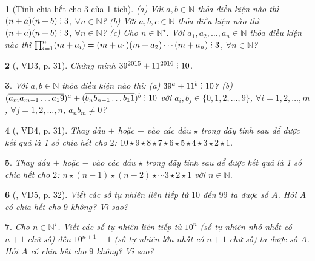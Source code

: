\documentclass{article}
\newtheorem{baitoan}{}
\DeclareRobustCommand{\divby}{%
	\mathrel{\vbox{\baselineskip.65ex\lineskiplimit0pt\hbox{.}\hbox{.}\hbox{.}}}%
}
\begin{document}
\begin{baitoan}[Tính chia hết cho 3 của 1 tích]
	(a) Với $a,b\in\mathbb{N}$ thỏa điều kiện nào thì $(n + a)(n + b)\divby3$, $\forall n\in\mathbb{N}$? (b) Với $a,b,c\in\mathbb{N}$ thỏa điều kiện nào thì $(n + a)(n + b)\divby3$, $\forall n\in\mathbb{N}$? (c) Cho $n\in\mathbb{N}^\star$. Với $a_1,a_2,\ldots,a_n\in\mathbb{N}$ thỏa điều kiện nào thì $\prod_{i=1}^n (m + a_i) = (m + a_1)(m + a_2)\cdots(m + a_n)\divby3$, $\forall n\in\mathbb{N}$?
\end{baitoan}

\begin{baitoan}[\cite{Binh_boi_duong_Toan_6_tap_1}, VD3, p. 31]
	Chứng minh $39^{2015} + 11^{2016}\divby10$.
\end{baitoan}

\begin{baitoan}
	Với $a,b\in\mathbb{N}$ thỏa điều kiện nào thì: (a) $39^a + 11^b\divby10$? (b) $(\overline{a_ma_{m-1}\ldots a_19})^a + (\overline{b_nb_{n-1}\ldots b_11})^b\divby10$ với $a_i,b_j\in\{0,1,2,\ldots,9\}$, $\forall i = 1,2,\ldots,m$, $\forall j = 1,2,\ldots,n$, $a_nb_m\ne0$?
\end{baitoan}

\begin{baitoan}[\cite{Binh_boi_duong_Toan_6_tap_1}, VD4, p. 31]
	Thay dấu $+$ hoặc $-$ vào các dấu $\star$ trong dãy tính sau để được kết quả là 1 số chia hết cho $2$: $10\star9\star8\star7\star6\star5\star4\star3\star2\star1$.
\end{baitoan}

\begin{baitoan}
	Thay dấu $+$ hoặc $-$ vào các dấu $\star$ trong dãy tính sau để được kết quả là 1 số chia hết cho $2$: $n\star(n - 1)\star(n - 2)\star\cdots3\star2\star1$ với $n\in\mathbb{N}$.
\end{baitoan}

\begin{baitoan}[\cite{Binh_boi_duong_Toan_6_tap_1}, VD5, p. 32]
	Viết các số tự nhiên liên tiếp từ $10$ đến $99$ ta được số $A$. Hỏi $A$ có chia hết cho $9$ không? Vì sao?
\end{baitoan}

\begin{baitoan}
	Cho $n\in\mathbb{N}^\star$. Viết các số tự nhiên liên tiếp từ $10^n$ (số tự nhiên nhỏ nhất có $n + 1$ chữ số) đến $10^{n+1} - 1$ (số tự nhiên lớn nhất có $n + 1$ chữ số) ta được số $A$. Hỏi $A$ có chia hết cho $9$ không? Vì sao?
\end{baitoan}
\end{document}
